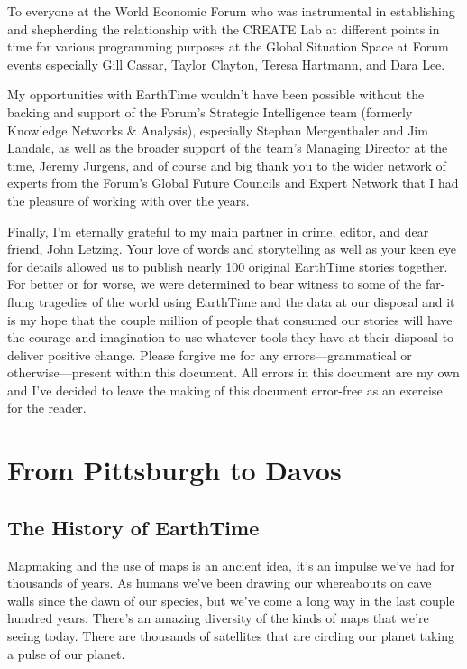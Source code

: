 \documentclass[
]{book}
\begin{document}
To everyone at the World Economic Forum who was instrumental in establishing and shepherding the relationship with the CREATE Lab at different points in time for various programming purposes at the Global Situation Space at Forum events especially Gill Cassar, Taylor Clayton, Teresa Hartmann, and Dara Lee.

My opportunities with EarthTime wouldn't have been possible without the backing and support of the Forum's Strategic Intelligence team (formerly Knowledge Networks \& Analysis), especially Stephan Mergenthaler and Jim Landale, as well as the broader support of the team's Managing Director at the time, Jeremy Jurgens, and of course and big thank you to the wider network of experts from the Forum's Global Future Councils and Expert Network that I had the pleasure of working with over the years.

Finally, I'm eternally grateful to my main partner in crime, editor, and dear friend, John Letzing. Your love of words and storytelling as well as your keen eye for details allowed us to publish nearly 100 original EarthTime stories together. For better or for worse, we were determined to bear witness to some of the far-flung tragedies of the world using EarthTime and the data at our disposal and it is my hope that the couple million of people that consumed our stories will have the courage and imagination to use whatever tools they have at their disposal to deliver positive change. Please forgive me for any errors---grammatical or otherwise---present within this document. All errors in this document are my own and I've decided to leave the making of this document error-free as an exercise for the reader.

\hypertarget{part-from-pittsburgh-to-davos}{%
\part{From Pittsburgh to Davos}\label{part-from-pittsburgh-to-davos}}

\hypertarget{the-history-of-earthtime}{%
\chapter{The History of EarthTime}\label{the-history-of-earthtime}}

Mapmaking and the use of maps is an ancient idea, it's an impulse we've had for thousands of years. As humans we've been drawing our whereabouts on cave walls since the dawn of our species, but we've come a long way in the last couple hundred years. There's an amazing diversity of the kinds of maps that we're seeing today. There are thousands of satellites that are circling our planet taking a pulse of our planet.
\end{document}
